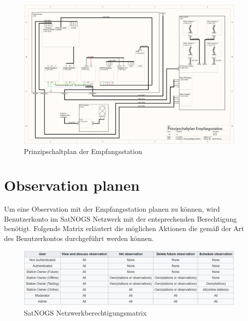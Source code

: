 \begin{landscape}
	\begin{figure}
		\centering
		\includegraphics[width=\linewidth]{../ref/Prinzipschaltplan.jpg}
		\caption{Prinzipschaltplan der Empfangsstation}
		\label{fig:prinzipschaltplan}
	\end{figure}
\end{landscape}

\section{Observation planen}
Um eine Observation mit der Empfangsstation planen zu können, wird Benutzerkonto im SatNOGS Netzwerk mit der entsprechenden Berechtigung benötigt. Folgende Matrix erläutert die möglichen Aktionen die gemäß der Art des Benutzerkontos durchgeführt werden können.

\begin{figure} [H]
	\centering
	\includegraphics[width=\linewidth]{../ref/network_permission_matrix.png}
	\caption{SatNOGS Netzwerkberechtigungsmatrix}
	\label{fig:networkpermissionmatrix}
\end{figure}


	




